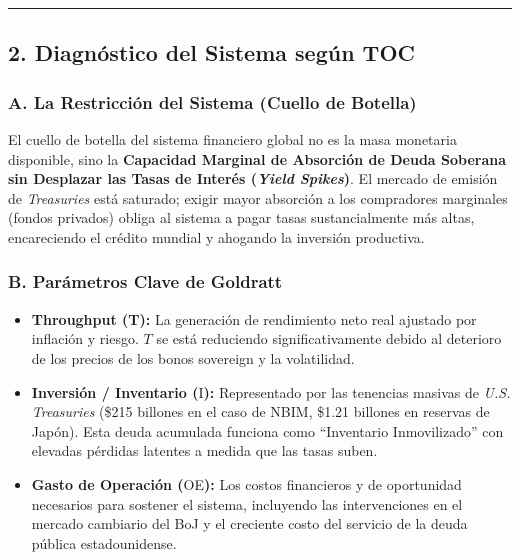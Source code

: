 \documentclass[12pt,letterpaper]{article}
\providecommand{\tightlist}{%
  \setlength{\itemsep}{0pt}\setlength{\parskip}{0pt}}
\begin{document}
\begin{center}\rule{0.5\linewidth}{0.5pt}\end{center}

\hypertarget{diagnuxf3stico-del-sistema-seguxfan-toc}{%
\subsection{2. Diagnóstico del Sistema según
TOC}\label{diagnuxf3stico-del-sistema-seguxfan-toc}}

\hypertarget{a.-la-restricciuxf3n-del-sistema-cuello-de-botella}{%
\subsubsection{\texorpdfstring{\textbf{A. La Restricción del Sistema
(Cuello de
Botella)}}{A. La Restricción del Sistema (Cuello de Botella)}}\label{a.-la-restricciuxf3n-del-sistema-cuello-de-botella}}

El cuello de botella del sistema financiero global no es la masa
monetaria disponible, sino la \textbf{Capacidad Marginal de Absorción de
Deuda Soberana sin Desplazar las Tasas de Interés (\emph{Yield
Spikes})}. El mercado de emisión de \emph{Treasuries} está saturado;
exigir mayor absorción a los compradores marginales (fondos privados)
obliga al sistema a pagar tasas sustancialmente más altas, encareciendo
el crédito mundial y ahogando la inversión productiva.

\hypertarget{b.-paruxe1metros-clave-de-goldratt}{%
\subsubsection{\texorpdfstring{\textbf{B. Parámetros Clave de
Goldratt}}{B. Parámetros Clave de Goldratt}}\label{b.-paruxe1metros-clave-de-goldratt}}

\begin{itemize}
\tightlist
\item
  \textbf{Throughput (T):} La generación de rendimiento neto real
  ajustado por inflación y riesgo. \(T\) se está reduciendo
  significativamente debido al deterioro de los precios de los bonos
  sovereign y la volatilidad.
\item
  \textbf{Inversión / Inventario (}I\textbf{):} Representado por las
  tenencias masivas de \emph{U.S. Treasuries} (\$215 billones en el caso
  de NBIM, \$1.21 billones en reservas de Japón). Esta deuda acumulada
  funciona como ``Inventario Inmovilizado'' con elevadas pérdidas
  latentes a medida que las tasas suben.
\item
  \textbf{Gasto de Operación (}OE\textbf{):} Los costos financieros y de
  oportunidad necesarios para sostener el sistema, incluyendo las
  intervenciones en el mercado cambiario del BoJ y el creciente costo
  del servicio de la deuda pública estadounidense.
\end{itemize}
\end{document}

